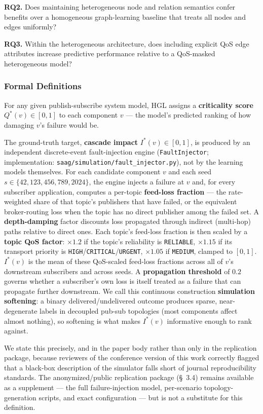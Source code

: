 \documentclass[review]{elsarticle}
\begin{document}
\textbf{RQ2.} Does maintaining heterogeneous node and relation semantics confer benefits over a
homogeneous graph-learning baseline that treats all nodes and edges uniformly?

\textbf{RQ3.} Within the heterogeneous architecture, does including explicit QoS edge attributes
increase predictive performance relative to a QoS-masked heterogeneous model?

\subsubsection*{Formal Definitions}

For any given publish-subscribe system model, HGL assigns a \textbf{criticality score} $Q^*(v) \in
[0,1]$ to each component $v$ --- the model's predicted ranking of how damaging $v$'s failure would
be.

The ground-truth target, \textbf{cascade impact} $I^*(v) \in [0,1]$, is produced by an independent
discrete-event fault-injection engine (\texttt{FaultInjector}; implementation:
\texttt{saag/simulation/fault\_injector.py}), not by the learning models themselves. For each
candidate component $v$ and each seed $s \in \{42, 123, 456, 789, 2024\}$, the engine injects a
failure at $v$ and, for every subscriber application, computes a per-topic \textbf{feed-loss
fraction} --- the rate-weighted share of that topic's publishers that have failed, or the
equivalent broker-routing loss when the topic has no direct publisher among the failed set. A
\textbf{depth-damping} factor discounts loss propagated through indirect (multi-hop) paths relative
to direct ones. Each topic's feed-loss fraction is then scaled by a \textbf{topic QoS factor}:
$\times 1.2$ if the topic's reliability is \texttt{RELIABLE}, $\times 1.15$ if its transport
priority is \texttt{HIGH}/\texttt{CRITICAL}/\texttt{URGENT}, $\times 1.05$ if \texttt{MEDIUM},
clamped to $[0,1]$. $I^*(v)$ is the mean of these QoS-scaled feed-loss fractions across all of $v$'s
downstream subscribers and across seeds. A \textbf{propagation threshold} of $0.2$ governs whether a
subscriber's own loss is itself treated as a failure that can propagate further downstream. We call
this continuous construction \textbf{simulation softening}: a binary delivered/undelivered outcome
produces sparse, near-degenerate labels in decoupled pub-sub topologies (most components affect
almost nothing), so softening is what makes $I^*(v)$ informative enough to rank against.

We state this precisely, and in the paper body rather than only in the replication package, because
reviewers of the conference version of this work correctly flagged that a black-box description of
the simulator falls short of journal reproducibility standards. The anonymized/public replication
package (\S~3.4) remains available as a supplement --- the full failure-injection model,
per-scenario topology-generation scripts, and exact configuration --- but is not a substitute for
this definition.
\end{document}
